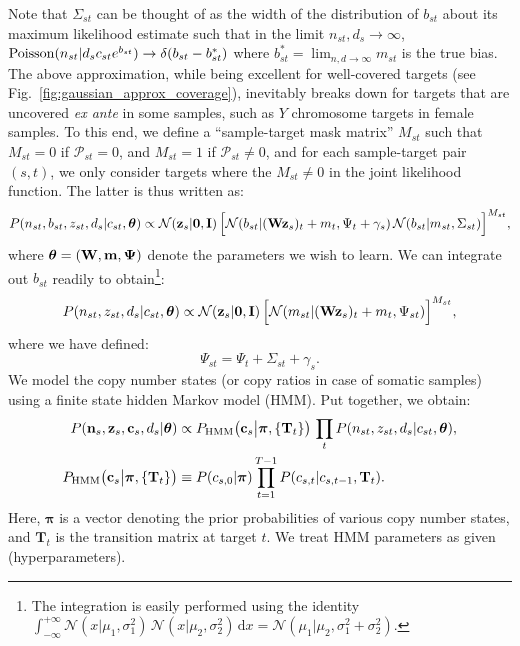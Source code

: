 \documentclass[nofootinbib,amssymb,amsmath]{revtex4}
\newcommand{\vzero}{{\bf 0}}
\newcommand{\vI}{{\bf I}}
\newcommand{\vc}{{\bf c}}
\newcommand{\vz}{{\bf z}}
\newcommand{\vn}{{\bf n}}
\newcommand{\vm}{{\bf m}}
\newcommand{\vW}{{\bf W}}
\newcommand{\vPsi}{{\bf \Psi}}
\newcommand{\vtheta}{{\boldsymbol \theta}}
\newcommand{\vpi}{{\boldsymbol \pi}}
\newcommand{\MM}{M}
\newcommand{\PP}{\mathcal{P}}
\newcommand{\norm}{{\mathcal N}}
\begin{document}
Note that $\Sigma_{st}$ can be thought of as the width of the distribution of $b_{st}$ about its maximum likelihood estimate such that in the limit $n_{st}, d_s \rightarrow \infty$, ${\rm Poisson}(n_{st} | d_s c_{st} e^{b_{st}}) \rightarrow \delta(b_{st} - b^*_{st})$ where $b^*_{st} = \lim_{n,d \rightarrow \infty} m_{st}$ is the true bias. The above approximation, while being excellent for well-covered targets (see Fig.~\ref{fig:gaussian_approx_coverage}), inevitably breaks down for targets that are uncovered {\em ex ante} in some samples, such as $Y$ chromosome targets in female samples. To this end, we define a ``sample-target mask matrix'' $\MM_{st}$ such that $\MM_{st} = 0$ if $\PP_{st} = 0$, and $\MM_{st} = 1$ if $\PP_{st} \neq 0$, and for each sample-target pair $(s,t)$, we only consider targets where the $\MM_{st} \neq 0$ in the joint likelihood function. The latter is thus written as:
\begin{equation}
P(n_{st}, b_{st}, z_{st}, d_s | c_{st}, \vtheta) \propto \norm(\vz_s | \vzero, \vI) \, \Big[\norm(b_{st} | (\vW \vz_s)_t + m_t, \Psi_t + \gamma_s) \, \norm(b_{st} | m_{st}, \Sigma_{st})\Big]^{M_{st}},
\end{equation}
where $\vtheta = (\vW, \vm, \vPsi)$ denote the parameters we wish to learn. We can integrate out $b_{st}$ readily to obtain\footnote{The integration is easily performed using the identity $\int_{-\infty}^{+\infty} \norm(x | \mu_1, \sigma_1^2) \, \norm(x | \mu_2, \sigma_2^2) \, \mathrm{d}x = \norm(\mu_1 | \mu_2, \sigma_1^2 + \sigma_2^2)$.}:
%
\begin{equation}
P(n_{st}, z_{st}, d_s | c_{st}, \vtheta) \propto \norm(\vz_s | \vzero, \vI) \, \Big[\norm(m_{st} | (\vW \vz_s)_t + m_t, \Psi_{st})\Big]^{M_{st}},
\label{coverage_likelihood}
\end{equation}
where we have defined:
\begin{equation}
\Psi_{st} = \Psi_t + \Sigma_{st} + \gamma_s.
\label{eq:psi_def}
\end{equation}
We model the copy number states (or copy ratios in case of somatic samples) using a finite state hidden Markov model (HMM). Put together, we obtain:
\begin{align}
P(\vn_s, \vz_s, \vc_s, d_s | \vtheta) &\propto P_\mathrm{HMM}\big(\vc_s \big|\vpi, \{\mathbf{T}_t\}\big)\, \prod_t P(n_{st}, z_{st}, d_s | c_{st}, \vtheta),\nonumber\\
P_\mathrm{HMM}\big(\vc_s \big|\vpi, \{\mathbf{T}_t\}\big) &\equiv P(c_{s,0}|\vpi) \prod_{t=1}^{T-1}P(c_{s,t}| c_{s,t-1}, \mathbf{T}_t).
\label{eq:complete_likelihood}
\end{align}
Here, $\vpi$ is a vector denoting the prior probabilities of various copy number states, and $\mathbf{T}_t$ is the transition matrix at target $t$. We treat HMM parameters as given (hyperparameters).\\
\end{document}
